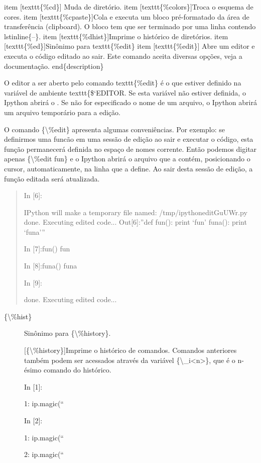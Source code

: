 \documentclass[a4paper,10pt,portuguese]{sphinxmanual}
\begin{document}
item {[}texttt\{\%cd\}{]} Muda de diretório.
item {[}texttt\{\%colors\}{]}Troca o esquema de cores.
item {[}texttt\{\%cpaste\}{]}Cola e executa um bloco pré-formatado da área de transferência (clipboard). O bloco tem que ser terminado por uma linha contendo lstinline\{--\}.
item {[}texttt\{\%dhist\}{]}Imprime o histórico de diretórios.
item {[}texttt\{\%ed\}{]}Sinônimo para texttt\{\%edit\}
item {[}texttt\{\%edit\}{]} Abre um editor e executa o código editado ao sair. Este comando aceita diversas opções, veja a documentação.
end\{description\}

O editor a ser aberto pelo comando texttt\{\%edit\} é o que estiver definido na variável de ambiente texttt\{\${}`EDITOR.
Se esta variável não estiver definida, o Ipython abrirá o .
Se não for especificado o nome de um arquivo, o Ipython abrirá um
arquivo temporário para a edição.

O comando \{\textbackslash{}\%edit\} apresenta algumas conveniências. Por exemplo:
se definirmos uma funcão  em uma sessão de edição ao sair e
executar o código, esta função permanecerá definida no espaço de
nomes corrente. Então podemos digitar apenas \{\textbackslash{}\%edit fun\} e o
Ipython abrirá o arquivo que a contém, posicionando o cursor,
automaticamente, na linha que a define. Ao sair desta sessão de
edição, a função editada será atualizada.
\begin{quote}

In {[}6{]}:

IPython will make a temporary file named: /tmp/ipythoneditGuUWr.py
done. Executing edited code... Out{[}6{]}:''def fun(): print `fun'
funa(): print `funa'''

In {[}7{]}:fun() fun

In {[}8{]}:funa() funa

In {[}9{]}:

done. Executing edited code...
\end{quote}
\begin{description}
\item[{\{\textbackslash{}\%hist\}}] \leavevmode
Sinônimo para \{\textbackslash{}\%history\}.

{[}\{\textbackslash{}\%history\}{]}Imprime o histórico de comandos. Comandos anteriores
também podem ser acessados através da variável \{\textbackslash{}\_i\textless{}n\textgreater{}\}, que é o
n-ésimo comando do histórico.

In {[}1{]}:

1: ip.magic(``

In {[}2{]}:

1: ip.magic(``

2: ip.magic(``

\end{description}
\end{document}
